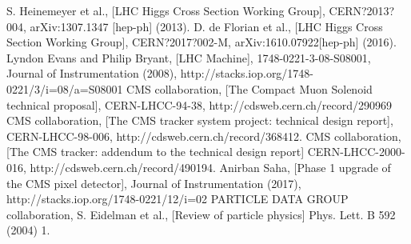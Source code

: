 \begin{thebibliography}{999}
		 S. Heinemeyer et al., [LHC Higgs Cross Section Working Group], CERN?2013?004, arXiv:1307.1347 [hep-ph] (2013).
		 D. de Florian et al., [LHC Higgs Cross Section Working Group], CERN?2017?002-M, arXiv:1610.07922[hep-ph] (2016).
		 Lyndon Evans and Philip Bryant, [LHC Machine], 1748-0221-3-08-S08001, Journal of Instrumentation (2008), http://stacks.iop.org/1748-0221/3/i=08/a=S08001
		 CMS collaboration, [The Compact Muon Solenoid technical proposal], CERN-LHCC-94-38, http://cdsweb.cern.ch/record/290969
		  CMS collaboration, [The CMS tracker system project: technical design report], CERN-LHCC-98-006, http://cdsweb.cern.ch/record/368412.
		  CMS collaboration, [The CMS tracker: addendum to the technical design report] CERN-LHCC-2000-016, http://cdsweb.cern.ch/record/490194.
		 Anirban Saha, [Phase 1 upgrade of the CMS pixel detector], Journal of Instrumentation (2017), http://stacks.iop.org/1748-0221/12/i=02
		 PARTICLE DATA GROUP collaboration, S. Eidelman et al., [Review of particle physics] Phys. Lett. B 592 (2004) 1.
				
           	  
	 
	 \end{thebibliography}
\clearpage{\pagestyle{empty}\cleardoublepage}